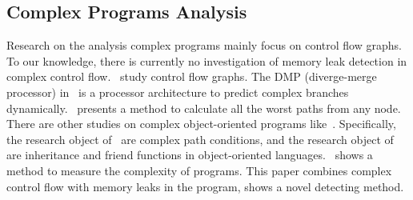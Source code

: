 \subsection{Complex Programs Analysis}
Research on the analysis complex programs mainly focus on control flow graphs. To our knowledge, there is currently no investigation of memory leak detection in complex control flow.~\cite{KJMP06,KFM13} study control flow graphs. The DMP (diverge-merge processor) in~\cite{KJMP06} is a processor architecture to predict complex branches dynamically.~\cite{KFM13} presents a method to calculate all the worst paths from any node. There are other studies on complex object-oriented programs like~\cite{LLQ16, MGDD14}. Specifically, the research object of~\cite{LLQ16} are complex path conditions, and the research object of~\cite{MGDD14} are inheritance and friend functions in object-oriented languages.~\cite{KK12} shows a method to measure the complexity of programs. This paper combines complex control flow with memory leaks in the program, shows a novel detecting method.
